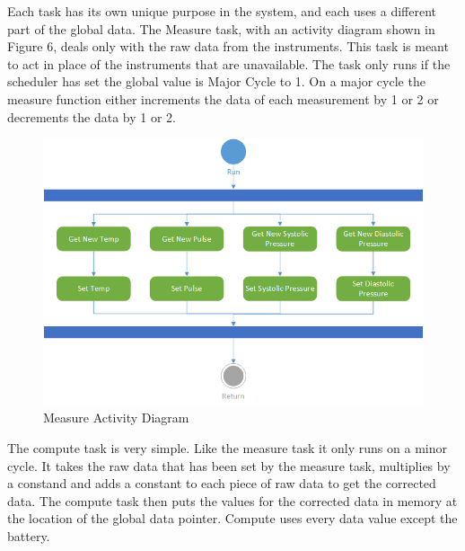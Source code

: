 \documentclass[12pt]{article} %
\begin{document}
Each task has its own unique purpose in the system, and each uses a different part of the global data. The Measure task, with an activity diagram shown in Figure 6, deals only with the raw data from the instruments. This task is meant to act in place of the instruments that are unavailable. The task only runs if the scheduler has set the global value is Major Cycle to 1. On a major cycle the measure function either increments the data of each measurement by 1 or 2 or decrements the data by 1 or 2.

\begin{figure}
    \centering
    \includegraphics[width=\textwidth]{design/measure_activity.png}
    \caption{Measure Activity Diagram}
    \label{fig:measure}
\end{figure}


The compute task is very simple. Like the measure task it only runs on a minor cycle. It takes the raw data that has been set by the measure task, multiplies by a constand and adds a constant to each piece of raw data to get the corrected data. The compute task then puts the values for the corrected data in memory at the location of the global data pointer. Compute uses every data value except the battery.
\end{document}
